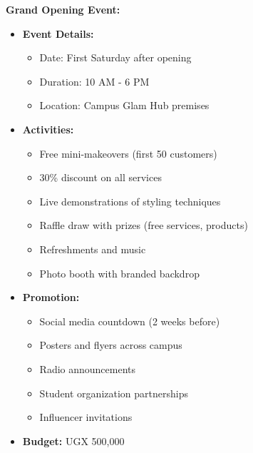 \textbf{Grand Opening Event:}
\begin{itemize}[leftmargin=2em]
    \item \textbf{Event Details:}
    \begin{itemize}
        \item Date: First Saturday after opening
        \item Duration: 10 AM - 6 PM
        \item Location: Campus Glam Hub premises
    \end{itemize}
    
    \item \textbf{Activities:}
    \begin{itemize}
        \item Free mini-makeovers (first 50 customers)
        \item 30\% discount on all services
        \item Live demonstrations of styling techniques
        \item Raffle draw with prizes (free services, products)
        \item Refreshments and music
        \item Photo booth with branded backdrop
    \end{itemize}
    
    \item \textbf{Promotion:}
    \begin{itemize}
        \item Social media countdown (2 weeks before)
        \item Posters and flyers across campus
        \item Radio announcements
        \item Student organization partnerships
        \item Influencer invitations
    \end{itemize}
    
    \item \textbf{Budget:} UGX 500,000
\end{itemize}

